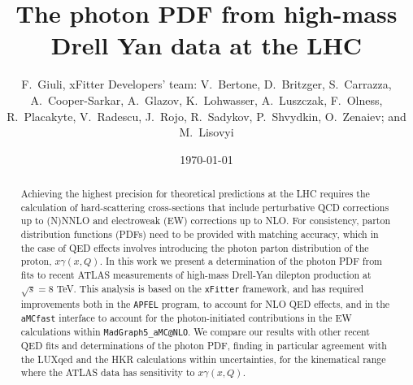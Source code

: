 \documentclass[english,aps]{revtex4-1}
\begin{document}
\linenumbers

\title{The photon PDF from high-mass Drell Yan data at the LHC}

\author{F.~Giuli, xFitter Developers' team: V.~Bertone, D.~Britzger, S.~Carrazza, A.~Cooper-Sarkar, A.~Glazov, K.~Lohwasser, A.~Luszczak,  F.~Olness,
 R.~Placakyte, V.~Radescu,  J.~Rojo, R.~Sadykov, P.~Shvydkin,  O.~Zenaiev;  and M.~Lisovyi}

\date{\today}
\begin{abstract}
  Achieving the highest precision for theoretical predictions
  at the LHC requires the 
  calculation of hard-scattering cross-sections that include
  perturbative QCD corrections up to (N)NNLO and electroweak (EW)
  corrections up to NLO.
  For consistency, parton distribution functions (PDFs) need to be
  provided with matching accuracy, which in the case of QED effects
  involves introducing the photon parton distribution of the proton,
  $x\gamma(x,Q)$.
  In this work we present a determination of the photon PDF from
  fits to recent ATLAS measurements of high-mass Drell-Yan dilepton
  production at $\sqrt{s}=8$ TeV.
  This analysis is based on the {\tt xFitter} framework,
  and has required improvements both in the {\tt APFEL} program, to account
  for NLO QED effects, and in the {\tt aMCfast} interface to account
  for the photon-initiated contributions in the EW calculations within
  {\tt MadGraph5\_aMC@NLO}.
  We compare our results with other recent QED fits and
  determinations of the photon PDF,
  finding in particular agreement with the LUXqed
  and the HKR calculations within uncertainties, for the
  kinematical range where the ATLAS data has sensitivity to
  $x\gamma(x,Q)$.
\end{abstract}
\maketitle

\tableofcontents{}












\end{document}
